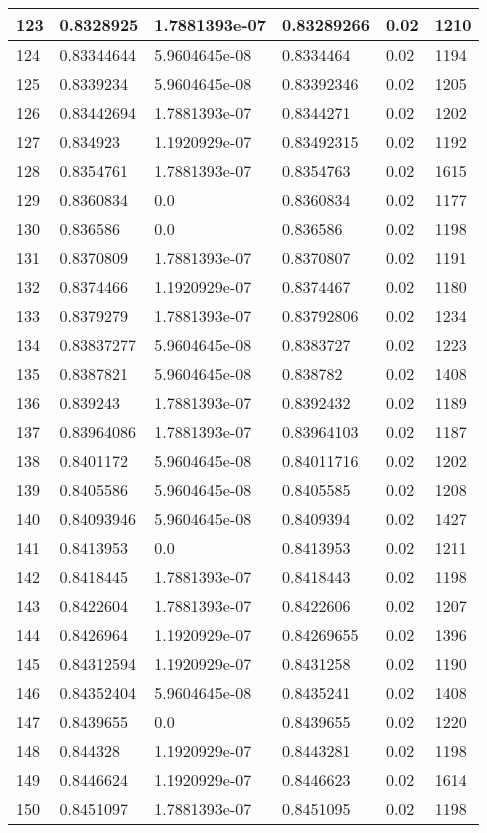 \begin{longtable}{|l|l|l|l|l|l|}
123 & 0.8328925 & 1.7881393e-07 & 0.83289266 & 0.02 & 1210 \\ \hline 
124 & 0.83344644 & 5.9604645e-08 & 0.8334464 & 0.02 & 1194 \\ \hline 
125 & 0.8339234 & 5.9604645e-08 & 0.83392346 & 0.02 & 1205 \\ \hline 
126 & 0.83442694 & 1.7881393e-07 & 0.8344271 & 0.02 & 1202 \\ \hline 
127 & 0.834923 & 1.1920929e-07 & 0.83492315 & 0.02 & 1192 \\ \hline 
128 & 0.8354761 & 1.7881393e-07 & 0.8354763 & 0.02 & 1615 \\ \hline 
129 & 0.8360834 & 0.0 & 0.8360834 & 0.02 & 1177 \\ \hline 
130 & 0.836586 & 0.0 & 0.836586 & 0.02 & 1198 \\ \hline 
131 & 0.8370809 & 1.7881393e-07 & 0.8370807 & 0.02 & 1191 \\ \hline 
132 & 0.8374466 & 1.1920929e-07 & 0.8374467 & 0.02 & 1180 \\ \hline 
133 & 0.8379279 & 1.7881393e-07 & 0.83792806 & 0.02 & 1234 \\ \hline 
134 & 0.83837277 & 5.9604645e-08 & 0.8383727 & 0.02 & 1223 \\ \hline 
135 & 0.8387821 & 5.9604645e-08 & 0.838782 & 0.02 & 1408 \\ \hline 
136 & 0.839243 & 1.7881393e-07 & 0.8392432 & 0.02 & 1189 \\ \hline 
137 & 0.83964086 & 1.7881393e-07 & 0.83964103 & 0.02 & 1187 \\ \hline 
138 & 0.8401172 & 5.9604645e-08 & 0.84011716 & 0.02 & 1202 \\ \hline 
139 & 0.8405586 & 5.9604645e-08 & 0.8405585 & 0.02 & 1208 \\ \hline 
140 & 0.84093946 & 5.9604645e-08 & 0.8409394 & 0.02 & 1427 \\ \hline 
141 & 0.8413953 & 0.0 & 0.8413953 & 0.02 & 1211 \\ \hline 
142 & 0.8418445 & 1.7881393e-07 & 0.8418443 & 0.02 & 1198 \\ \hline 
143 & 0.8422604 & 1.7881393e-07 & 0.8422606 & 0.02 & 1207 \\ \hline 
144 & 0.8426964 & 1.1920929e-07 & 0.84269655 & 0.02 & 1396 \\ \hline 
145 & 0.84312594 & 1.1920929e-07 & 0.8431258 & 0.02 & 1190 \\ \hline 
146 & 0.84352404 & 5.9604645e-08 & 0.8435241 & 0.02 & 1408 \\ \hline 
147 & 0.8439655 & 0.0 & 0.8439655 & 0.02 & 1220 \\ \hline 
148 & 0.844328 & 1.1920929e-07 & 0.8443281 & 0.02 & 1198 \\ \hline 
149 & 0.8446624 & 1.1920929e-07 & 0.8446623 & 0.02 & 1614 \\ \hline 
150 & 0.8451097 & 1.7881393e-07 & 0.8451095 & 0.02 & 1198 \\ \hline 
\end{longtable}